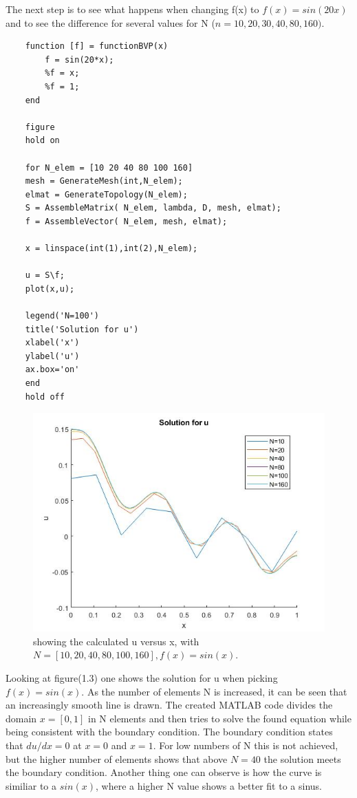 \documentclass[a4paper]{report}
\begin{document}
The next step is to see what happens when changing f(x) to $f(x)=sin(20x)$ and to see the difference for several values for N ($n=10,20,30,40,80,160)$.

\vspace{5mm}
\begin{lstlisting}
	function [f] = functionBVP(x)
		f = sin(20*x);
		%f = x;
		%f = 1;
	end
	
	figure 
	hold on
	
	for N_elem = [10 20 40 80 100 160]
	mesh = GenerateMesh(int,N_elem);
	elmat = GenerateTopology(N_elem);
	S = AssembleMatrix( N_elem, lambda, D, mesh, elmat);
	f = AssembleVector( N_elem, mesh, elmat);
	
	x = linspace(int(1),int(2),N_elem);
	
	u = S\f;
	plot(x,u);
	
	legend('N=100')
	title('Solution for u')
	xlabel('x')
	ylabel('u')
	ax.box='on'
	end
	hold off
\end{lstlisting}

\newpage

\begin{figure}[ht!]
	\centering
	\includegraphics[width=150mm]{1Dfsinx.jpg}
	\caption{showing the calculated u versus x, with  $N =[10, 20, 40, 80, 100, 160],f(x)=sin(x)$. 
	\label{overflow}}
\end{figure}

Looking at figure(1.3) one shows the solution for u when picking $f(x)=sin(x)$. As the number of elements N is increased, it can be seen that an increasingly smooth line is drawn. The created MATLAB code divides the domain $x=[0,1]$ in N elements and then tries to solve the found equation while being consistent with the boundary condition. The boundary condition states that $du/dx =0$ at $x=0$ and $x=1$. For low numbers of N this is not achieved, but the higher number of elements shows that above $N=40$ the solution meets the boundary condition. Another thing one can observe is how the curve is similiar to a $sin(x)$, where a higher N value shows a better fit to a sinus.
\end{document}
